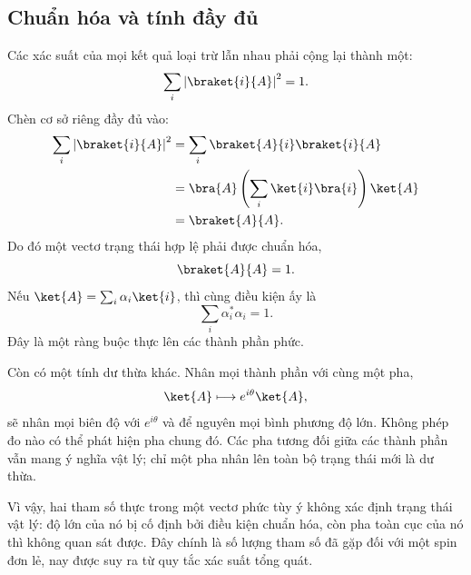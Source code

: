 \subsection{Chuẩn hóa và tính đầy đủ}

Các xác suất của mọi kết quả loại trừ lẫn nhau phải cộng lại thành một:
\begin{equation}
\sum_i\left|\braket{i}{A}\right|^2=1.
\label{eq:probability-normalization}
\end{equation}
Chèn cơ sở riêng đầy đủ vào:
\begin{align}
\sum_i\left|\braket{i}{A}\right|^2
 &=\sum_i\braket{A}{i}\braket{i}{A}\\
 &=\bra{A}\left(\sum_i\ket{i}\bra{i}\right)\ket{A}\\
 &=\braket{A}{A}.
\end{align}
Do đó một vectơ trạng thái hợp lệ phải được chuẩn hóa,
\begin{equation}
\braket{A}{A}=1.
\label{eq:state-normalization}
\end{equation}
Nếu \(\ket{A}=\sum_i\alpha_i\ket{i}\), thì cùng điều kiện ấy là
\begin{equation}
\sum_i\alpha_i^*\alpha_i=1.
\label{eq:component-normalization}
\end{equation}
Đây là một ràng buộc thực lên các thành phần phức.

\begin{classroomqa}
\end{classroomqa}

Còn có một tính dư thừa khác. Nhân mọi thành phần với cùng một pha,
\begin{equation}
\ket{A}\longmapsto e^{i\theta}\ket{A},
\label{eq:l3-global-phase}
\end{equation}
sẽ nhân mọi biên độ với \(e^{i\theta}\) và để nguyên mọi bình phương độ lớn. Không phép đo nào có thể phát hiện pha chung đó. Các pha tương đối giữa các thành phần vẫn mang ý nghĩa vật lý; chỉ một pha nhân lên toàn bộ trạng thái mới là dư thừa.

Vì vậy, hai tham số thực trong một vectơ phức tùy ý không xác định trạng thái vật lý: độ lớn của nó bị cố định bởi điều kiện chuẩn hóa, còn pha toàn cục của nó thì không quan sát được. Đây chính là số lượng tham số đã gặp đối với một spin đơn lẻ, nay được suy ra từ quy tắc xác suất tổng quát.

